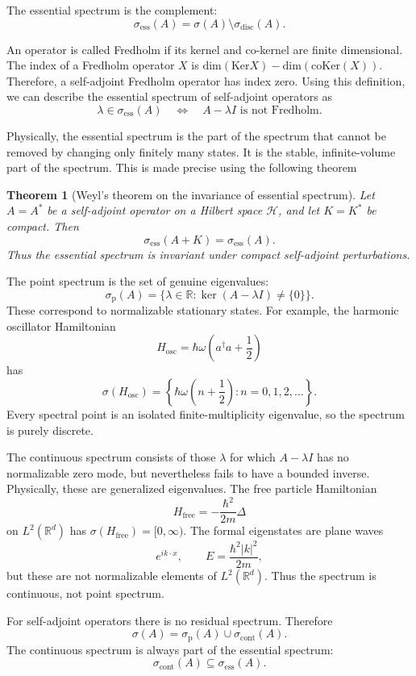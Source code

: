 \documentclass[JHEP,12pt]{article}
\newtheorem{theorem}[lemma]{Theorem}
\begin{document}
The essential spectrum is the complement:
\[
\sigma_{\mathrm{ess}}(A)=\sigma(A)\setminus\sigma_{\mathrm{disc}}(A).
\]

An operator is called Fredholm if its kernel and co-kernel are finite dimensional. The index of a Fredholm operator $X$ is $\text{dim}(\text{Ker} X)-\text{dim}(\text{coKer}(X))$. Therefore, a self-adjoint Fredholm operator has index zero. 
Using this definition, we can describe the essential spectrum of self-adjoint operators as
\[
\lambda\in\sigma_{\mathrm{ess}}(A)
\quad\Longleftrightarrow\quad
A-\lambda I \text{ is not Fredholm}.
\]

Physically, the essential spectrum is the part of the spectrum that cannot be
removed by changing only finitely many states. It is the stable, infinite-volume
part of the spectrum. This is made precise using the following theorem 
\begin{theorem}[Weyl's theorem on the invariance of essential spectrum]
Let \(A=A^\ast\) be a self-adjoint operator on a Hilbert space \(\mathcal H\),
and let \(K=K^\ast\) be compact. Then
\[
\sigma_{\mathrm{ess}}(A+K)
=
\sigma_{\mathrm{ess}}(A).
\]
Thus the essential spectrum is invariant under compact self-adjoint
perturbations.
\end{theorem}


The point spectrum is the set of genuine eigenvalues:
\[
\sigma_{\mathrm p}(A)=
\{\lambda\in\mathbb R:\ker(A-\lambda I)\neq\{0\}\}.
\]
These correspond to normalizable stationary states. For example, the harmonic
oscillator Hamiltonian
\[
H_{\mathrm{osc}}
=
\hbar\omega\left(a^\dagger a+\frac12\right)
\]
has
\[
\sigma(H_{\mathrm{osc}})
=
\left\{\hbar\omega\left(n+\frac12\right):n=0,1,2,\ldots\right\}.
\]
Every spectral point is an isolated finite-multiplicity eigenvalue, so the
spectrum is purely discrete.

The continuous spectrum consists of those \(\lambda\) for which
\(A-\lambda I\) has no normalizable zero mode, but nevertheless fails to have a
bounded inverse. Physically, these are generalized eigenvalues. The free
particle Hamiltonian
\[
H_{\mathrm{free}}=-\frac{\hbar^2}{2m}\Delta
\]
on \(L^2(\mathbb R^d)\) has $
\sigma(H_{\mathrm{free}})=[0,\infty)$.
The formal eigenstates are plane waves
\[
e^{ik\cdot x},
\qquad
E=\frac{\hbar^2 |k|^2}{2m},
\]
but these are not normalizable elements of \(L^2(\mathbb R^d)\). Thus the
spectrum is continuous, not point spectrum.

For self-adjoint operators there is no residual spectrum. Therefore
\[
\sigma(A)=\sigma_{\mathrm p}(A)\cup\sigma_{\mathrm{cont}}(A).
\]
The continuous spectrum is always part of the essential spectrum:
\[
\sigma_{\mathrm{cont}}(A)\subseteq\sigma_{\mathrm{ess}}(A).
\]
\end{document}
